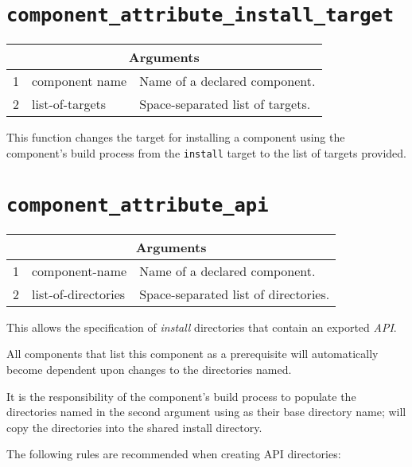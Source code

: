 \section{\texttt{component\_attribute\_install\_target}}\label{api:component-attribute-install-target}

\begin{tabularx}{\linewidth}{ll|X}
  \multicolumn{3}{c}{\textbf{Arguments}} \\ \hline

  1 & component name & Name of a declared component. \\
  2 & list-of-targets & Space-separated list of targets.
\end{tabularx}

This function changes the target for installing a component using the
component's build process from the \texttt{install} \make target to
the list of targets provided.

\section{\texttt{component\_attribute\_api}}\label{api:component-attribute-api}

\begin{tabularx}{\linewidth}{ll|X}
  \multicolumn{3}{c}{\textbf{Arguments}} \\ \hline

  1 & component-name & Name of a declared component. \\
  2 & list-of-directories &  Space-separated list of directories.
\end{tabularx}

This allows the specification of \emph{install} directories that
contain an exported \emph{API}.

All components that list this component as a prerequisite will
automatically become dependent upon changes to the directories named.

It is the responsibility of the component's build process to populate
the directories named in the second argument using \destdir as their
base directory name; \lmsbw will copy the \destdir directories into
the shared install directory.

The following rules are recommended when creating API directories:

